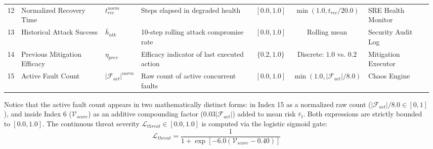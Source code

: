 \documentclass[ASNA,twocolumn]{USG}
\begin{document}
\begin{table}[!t]
{\begin{tabular}{clllccl}
12 & Normalized Recovery Time & $t_{rec}^{norm}$ & Steps elapsed in degraded health & $[0.0, 1.0]$ & $\min(1.0, t_{rec} / 20.0)$ & SRE Health Monitor \\
13 & Historical Attack Success & $\bar{h}_{atk}$ & 10-step rolling attack compromise rate & $[0.0, 1.0]$ & Rolling mean & Security Audit Log \\
14 & Previous Mitigation Efficacy & $\eta_{prev}$ & Efficacy indicator of last executed action & $\{0.2, 1.0\}$ & Discrete: $1.0$ vs. $0.2$ & Mitigation Executor \\
15 & Active Fault Count & $|\mathcal{F}_{act}|^{norm}$ & Raw count of active concurrent faults & $[0.0, 1.0]$ & $\min(1.0, |\mathcal{F}_{act}| / 8.0)$ & Chaos Engine \\
\bottomrule
\end{tabular}}
\end{table}

Notice that the active fault count appears in two mathematically distinct forms: in Index 15 as a normalized raw count ($|\mathcal{F}_{act}|/8.0 \in [0, 1]$), and inside Index 6 ($\mathcal{V}_{score}$) as an additive compounding factor ($0.03|\mathcal{F}_{act}|$) added to mean risk $\bar{r}_t$. Both expressions are strictly bounded to $[0.0, 1.0]$. The continuous threat severity $\mathcal{L}_{threat} \in [0.0, 1.0]$ is computed via the logistic sigmoid gate:
\begin{equation}
    \mathcal{L}_{threat} = \frac{1}{1 + \exp\left[-6.0\left(\mathcal{V}_{score} - 0.40\right)\right]}
\end{equation}
\end{document}

